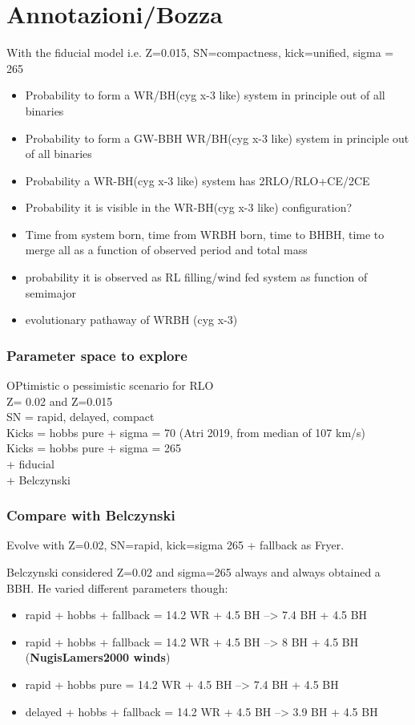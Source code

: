 \documentclass[a4paper,titlepage]{book}     	%
\begin{document}
\chapter{Annotazioni/Bozza}
With the fiducial model i.e. Z=0.015, SN=compactness, kick=unified, sigma = 265
\begin{itemize}
	\item Probability to form a WR/BH(cyg x-3 like) system in principle out of all binaries
	\item Probability to form a GW-BBH WR/BH(cyg x-3 like) system in principle out of all binaries
	\item Probability a WR-BH(cyg x-3 like) system has 2RLO/RLO+CE/2CE
	\item Probability it is visible in the WR-BH(cyg x-3 like) configuration?
	\item Time from system born, time from WRBH born, time to BHBH, time to merge all as a function of observed period and total mass
	\item probability it is observed as RL filling/wind fed system as function of semimajor
	\item evolutionary pathaway of WRBH (cyg x-3)
\end{itemize}


\subsection{Parameter space to explore}
OPtimistic o pessimistic scenario for RLO \\
Z= 0.02 and Z=0.015\\
SN = rapid, delayed, compact \\
Kicks = hobbs pure + sigma = 70 (Atri 2019, from median of 107 km/s) \\
Kicks = hobbs pure + sigma = 265 \\
+ fiducial \\
+ Belczynski


\subsection{Compare with Belczynski}
Evolve with Z=0.02, SN=rapid, kick=sigma 265 + fallback as Fryer.


Belczynski considered Z=0.02 and sigma=265 always and always obtained a BBH. He varied different parameters though:
\begin{itemize}
	\item rapid + hobbs + fallback = 14.2 WR + 4.5 BH --> 7.4 BH + 4.5 BH
	\item rapid + hobbs + fallback = 14.2 WR + 4.5 BH --> 8 BH + 4.5 BH (\textbf{NugisLamers2000 winds})
	\item rapid + hobbs pure = 14.2 WR + 4.5 BH --> 7.4 BH + 4.5 BH
	\item delayed + hobbs + fallback = 14.2 WR + 4.5 BH --> 3.9 BH + 4.5 BH
\end{itemize}
\end{document}
